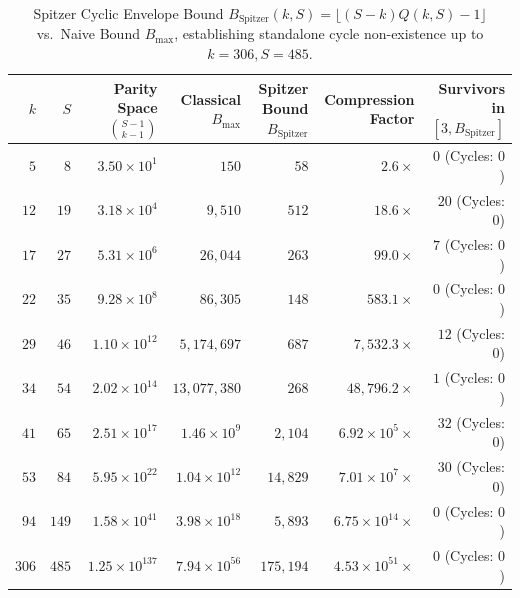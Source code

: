 \documentclass[11pt, a4paper]{amsart}
\theoremstyle{definition}
\begin{document}
\begin{table}[htbp]
\centering
\caption{Spitzer Cyclic Envelope Bound $B_{\text{Spitzer}}(k,S) = \lfloor (S-k)Q(k,S) - 1 \rfloor$ vs.\ Naive Bound $B_{\max}$, establishing standalone cycle non-existence up to $k=306, S=485$.}
\label{tab:spitzer_k306}
\footnotesize
\begin{tabular}{@{}rrrrrrr@{}}
\toprule
$k$ & $S$ & Parity Space $\binom{S-1}{k-1}$ & Classical $B_{\max}$ & Spitzer Bound $B_{\text{Spitzer}}$ & Compression Factor & Survivors in $[3, B_{\text{Spitzer}}]$ \\
\midrule
$5$   & $8$   & $3.50 \times 10^1$     & $150$                  & $58$      & $2.6\times$              & $0$ (Cycles: $0$) \\
$12$  & $19$  & $3.18 \times 10^4$     & $9,510$                & $512$     & $18.6\times$             & $20$ (Cycles: $0$) \\
$17$  & $27$  & $5.31 \times 10^6$     & $26,044$               & $263$     & $99.0\times$             & $7$ (Cycles: $0$) \\
$22$  & $35$  & $9.28 \times 10^8$     & $86,305$               & $148$     & $583.1\times$            & $0$ (Cycles: $0$) \\
$29$  & $46$  & $1.10 \times 10^{12}$  & $5,174,697$            & $687$     & $7,532.3\times$          & $12$ (Cycles: $0$) \\
$34$  & $54$  & $2.02 \times 10^{14}$  & $13,077,380$           & $268$     & $48,796.2\times$         & $1$ (Cycles: $0$) \\
$41$  & $65$  & $2.51 \times 10^{17}$  & $1.46 \times 10^9$     & $2,104$   & $6.92 \times 10^5\times$ & $32$ (Cycles: $0$) \\
$53$  & $84$  & $5.95 \times 10^{22}$  & $1.04 \times 10^{12}$  & $14,829$  & $7.01 \times 10^7\times$ & $30$ (Cycles: $0$) \\
$94$  & $149$ & $1.58 \times 10^{41}$  & $3.98 \times 10^{18}$  & $5,893$   & $6.75 \times 10^{14}\times$ & $0$ (Cycles: $0$) \\
$306$ & $485$ & $1.25 \times 10^{137}$ & $7.94 \times 10^{56}$  & $175,194$ & $4.53 \times 10^{51}\times$ & $0$ (Cycles: $0$) \\
\bottomrule
\end{tabular}
\end{table}
\end{document}
